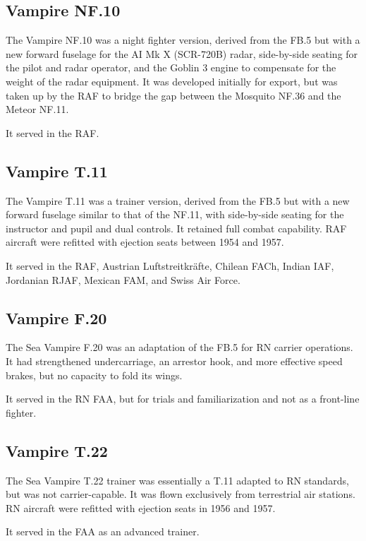 \subsection{Vampire NF.10}

The Vampire NF.10 was a night fighter version, derived from the FB.5 but with a new forward fuselage for the AI Mk X (SCR-720B) radar, side-by-side seating for the pilot and radar operator, and the Goblin 3 engine to compensate for the weight of the radar equipment. It was developed initially for export, but was taken up by the RAF to bridge the gap between the Mosquito NF.36 and the Meteor NF.11.

It served in the RAF.

\subsection{Vampire T.11}

The Vampire T.11 was a trainer version, derived from the FB.5 but with a new forward fuselage similar to that of the NF.11, with side-by-side seating for the instructor and pupil and dual controls. It retained full combat capability. RAF aircraft were refitted with ejection seats between 1954 and 1957.

It served in the RAF, Austrian Luftstreitkräfte, Chilean FACh, Indian IAF, Jordanian RJAF, Mexican FAM, and Swiss Air Force.

\subsection{Vampire F.20}

The Sea Vampire F.20 was an adaptation of the FB.5 for RN carrier operations. It had strengthened undercarriage, an arrestor hook, and more effective speed brakes, but no capacity to fold its wings.

It served in the RN FAA, but for trials and familiarization and not as a front-line fighter.

\subsection{Vampire T.22}

The Sea Vampire T.22 trainer was essentially a T.11 adapted to RN standards, but was not carrier-capable. It was flown exclusively from terrestrial air stations. RN aircraft were refitted with ejection seats in 1956 and 1957.

It served in the FAA as an advanced trainer.
